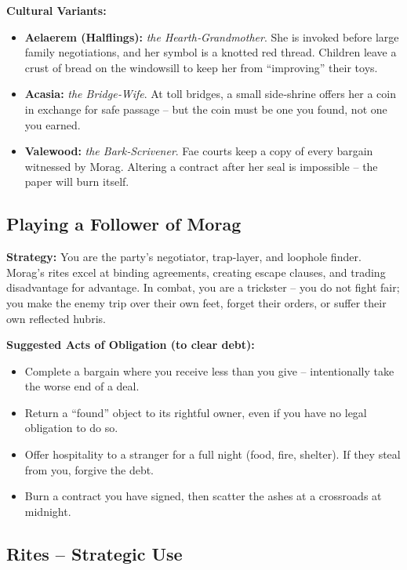 \documentclass[10pt,a5paper]{book}
\begin{document}
\textbf{Cultural Variants:}
\begin{itemize}
    \item \textbf{Aelaerem (Halflings):} \textit{the Hearth‑Grandmother}. She is invoked before large family negotiations, and her symbol is a knotted red thread. Children leave a crust of bread on the windowsill to keep her from “improving” their toys.
    \item \textbf{Acasia:} \textit{the Bridge‑Wife}. At toll bridges, a small side‑shrine offers her a coin in exchange for safe passage – but the coin must be one you found, not one you earned.
    \item \textbf{Valewood:} \textit{the Bark‑Scrivener}. Fae courts keep a copy of every bargain witnessed by Morag. Altering a contract after her seal is impossible – the paper will burn itself.
\end{itemize}

\subsection*{Playing a Follower of Morag}

\textbf{Strategy:} You are the party’s negotiator, trap‑layer, and loophole finder. Morag’s rites excel at binding agreements, creating escape clauses, and trading disadvantage for advantage. In combat, you are a trickster – you do not fight fair; you make the enemy trip over their own feet, forget their orders, or suffer their own reflected hubris.

\textbf{Suggested Acts of Obligation (to clear debt):}
\begin{itemize}
    \item Complete a bargain where you receive less than you give – intentionally take the worse end of a deal.
    \item Return a “found” object to its rightful owner, even if you have no legal obligation to do so.
    \item Offer hospitality to a stranger for a full night (food, fire, shelter). If they steal from you, forgive the debt.
    \item Burn a contract you have signed, then scatter the ashes at a crossroads at midnight.
\end{itemize}

\subsection*{Rites – Strategic Use}
\end{document}
